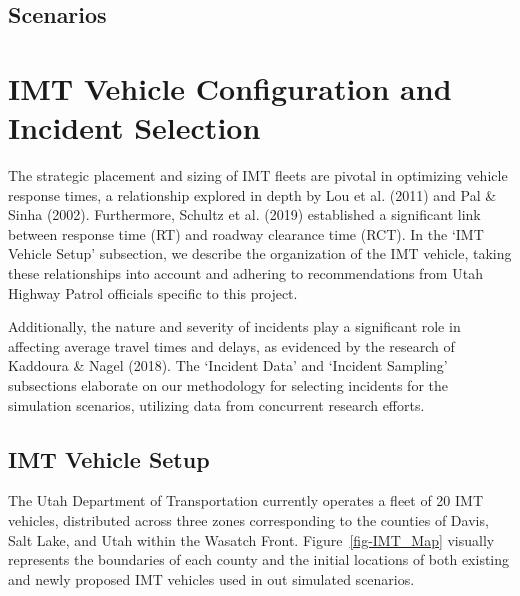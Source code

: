 \documentclass[fancy, oneside, mastersfancy, ms]{byuthesis}
\begin{document}
\hypertarget{sec-scenarios}{%
\subsection{Scenarios}\label{sec-scenarios}}

\hypertarget{imt-vehicle-configuration-and-incident-selection}{%
\section{IMT Vehicle Configuration and Incident
Selection}\label{imt-vehicle-configuration-and-incident-selection}}

The strategic placement and sizing of IMT fleets are pivotal in
optimizing vehicle response times, a relationship explored in depth by
Lou et al. (2011) and Pal \& Sinha (2002). Furthermore, Schultz et al.
(2019) established a significant link between response time (RT) and
roadway clearance time (RCT). In the `IMT Vehicle Setup' subsection, we
describe the organization of the IMT vehicle, taking these relationships
into account and adhering to recommendations from Utah Highway Patrol
officials specific to this project.

Additionally, the nature and severity of incidents play a significant
role in affecting average travel times and delays, as evidenced by the
research of Kaddoura \& Nagel (2018). The `Incident Data' and `Incident
Sampling' subsections elaborate on our methodology for selecting
incidents for the simulation scenarios, utilizing data from concurrent
research efforts.

\hypertarget{imt-vehicle-setup}{%
\subsection{IMT Vehicle Setup}\label{imt-vehicle-setup}}

The Utah Department of Transportation currently operates a fleet of 20
IMT vehicles, distributed across three zones corresponding to the
counties of Davis, Salt Lake, and Utah within the Wasatch Front.
Figure~\ref{fig-IMT_Map} visually represents the boundaries of each
county and the initial locations of both existing and newly proposed IMT
vehicles used in out simulated scenarios.
\end{document}
